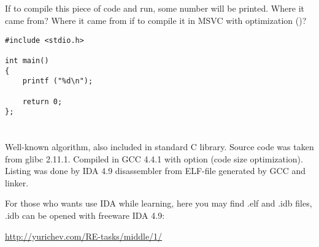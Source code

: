 \subsection{}

{If to compile this piece of code and run, some number will be printed. Where it came from?
Where it came from if to compile it in MSVC with optimization (\Ox)?}

\begin{lstlisting}
#include <stdio.h>

int main()
{
	printf ("%d\n");

	return 0;
};
\end{lstlisting}

\section{}

\subsection{}

{Well-known algorithm, also included in standard C library. Source code was taken from glibc 2.11.1.
Compiled in GCC 4.4.1 with  option (code size optimization).
Listing was done by IDA 4.9 disassembler from ELF-file generated by GCC and linker.}

{For those who wants use IDA while learning, here you may find .elf and .idb files,
.idb can be opened with freeware IDA 4.9:}

\url{http://yurichev.com/RE-tasks/middle/1/}



\subsection{}

